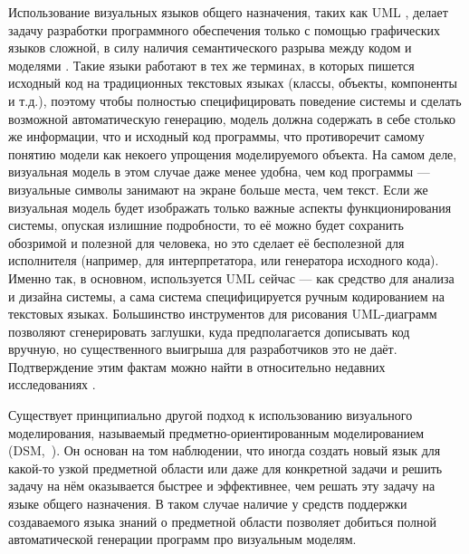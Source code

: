 Использование визуальных языков общего назначения, таких как \ac{UML}
, делает задачу разработки программного обеспечения только с помощью графических языков сложной, 
в силу наличия семантического разрыва между кодом и моделями 
\cite{selic2003pragmatics, koznov2008osnovy}. Такие языки работают в 
тех же терминах, в которых пишется исходный код на традиционных текстовых языках 
(классы, объекты, компоненты и т.д.), поэтому чтобы полностью специфицировать 
поведение системы и сделать возможной автоматическую генерацию, модель должна 
содержать в себе столько же информации, что и исходный код программы, что 
противоречит самому понятию модели как некоего упрощения моделируемого объекта. 
На самом деле, визуальная модель в этом случае даже менее удобна, чем код 
программы --- визуальные символы занимают на экране больше места, чем текст. 
Если же визуальная модель будет изображать только важные аспекты 
функционирования системы, опуская излишние подробности, то её можно будет 
сохранить обозримой и полезной для человека, но это сделает её бесполезной для 
исполнителя (например, для интерпретатора, или генератора исходного кода). 
Именно так, в основном, используется \ac{UML} сейчас --- как средство для анализа и 
дизайна системы, а сама система специфицируется ручным кодированием на текстовых 
языках. Большинство инструментов для рисования UML-диаграмм позволяют 
сгенерировать заглушки, куда предполагается дописывать код вручную, но 
существенного выигрыша для разработчиков это не даёт. Подтверждение этим фактам 
можно найти в относительно недавних исследованиях 
\cite{mohagheghi2013empirical, chen2012methodology}.

Существует принципиально другой подход к использованию визуального 
моделирования, называемый предметно-ориентированным моделированием 
(\ac{DSM},~\cite{kelly2008domain}). Он основан на том 
наблюдении, что иногда создать новый язык для какой-то узкой предметной области 
или даже для конкретной задачи и решить задачу на нём оказывается быстрее и 
эффективнее, чем решать эту задачу на языке общего назначения. В таком случае 
наличие у средств поддержки создаваемого языка знаний о предметной области 
позволяет добиться полной автоматической генерации программ про визуальным 
моделям. 

